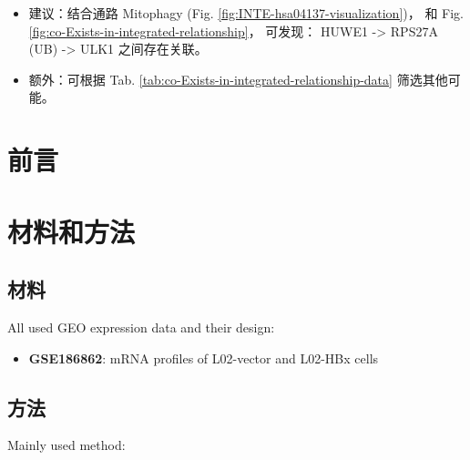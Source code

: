 \documentclass[
]{article}
\providecommand{\tightlist}{%
  \setlength{\itemsep}{0pt}\setlength{\parskip}{0pt}}
\begin{document}
\begin{itemize}
  \begin{itemize}
  \tightlist
  \item
    建议：结合通路 Mitophagy (Fig. \ref{fig:INTE-hsa04137-visualization})，
    和 Fig. \ref{fig:co-Exists-in-integrated-relationship}，
    可发现： HUWE1 -\textgreater{} RPS27A (UB) -\textgreater{} ULK1 之间存在关联。
  \item
    额外：可根据 Tab. \ref{tab:co-Exists-in-integrated-relationship-data} 筛选其他可能。
  \end{itemize}
\end{itemize}

\hypertarget{introduction}{%
\section{前言}\label{introduction}}

\hypertarget{methods}{%
\section{材料和方法}\label{methods}}

\hypertarget{ux6750ux6599}{%
\subsection{材料}\label{ux6750ux6599}}

All used GEO expression data and their design:

\begin{itemize}
\tightlist
\item
  \textbf{GSE186862}: mRNA profiles of L02-vector and L02-HBx cells
\end{itemize}

\hypertarget{ux65b9ux6cd5}{%
\subsection{方法}\label{ux65b9ux6cd5}}

Mainly used method:
\end{document}
